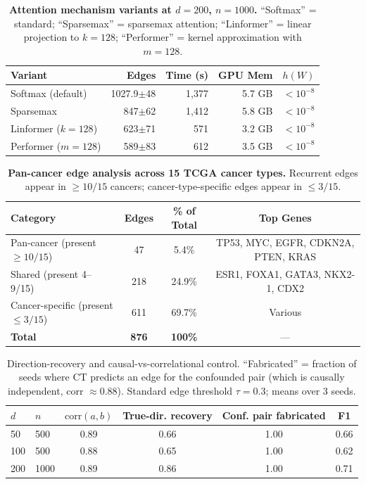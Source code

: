 \documentclass[12pt,a4paper]{article}
\begin{document}
\newpage
\begin{table}[H]
\centering
\caption{\textbf{Attention mechanism variants at $d=200$, $n=1000$.} ``Softmax'' = standard; ``Sparsemax'' = sparsemax attention; ``Linformer'' = linear projection to $k=128$; ``Performer'' = kernel approximation with $m=128$.}
\label{tab:s_ct_attention_variants}
\small
\begin{tabular}{lrrrc}
\toprule
Variant & Edges & Time (s) & GPU Mem & $h(W)$ \\
\midrule
Softmax (default) & 1027.9$\pm$48 & 1,377 & 5.7 GB & $<10^{-8}$ \\
Sparsemax & 847$\pm$62 & 1,412 & 5.8 GB & $<10^{-8}$ \\
Linformer ($k=128$) & 623$\pm$71 & 571 & 3.2 GB & $<10^{-8}$ \\
Performer ($m=128$) & 589$\pm$83 & 612 & 3.5 GB & $<10^{-8}$ \\
\bottomrule
\end{tabular}
\end{table}
\newpage
\begin{table}[H]
\centering
\caption{\textbf{Pan-cancer edge analysis across 15 TCGA cancer types.} Recurrent edges appear in $\ge 10/15$ cancers; cancer-type-specific edges appear in $\le 3/15$.}
\label{tab:s_pancancer}
\small
\begin{tabular}{lccc}
\toprule
Category & Edges & \% of Total & Top Genes \\
\midrule
Pan-cancer (present $\ge 10/15$) & 47 & 5.4\% & TP53, MYC, EGFR, CDKN2A, PTEN, KRAS \\
Shared (present 4--9/15) & 218 & 24.9\% & ESR1, FOXA1, GATA3, NKX2-1, CDX2 \\
Cancer-specific (present $\le 3/15$) & 611 & 69.7\% & Various \\
\midrule
\textbf{Total} & \textbf{876} & \textbf{100\%} & --- \\
\bottomrule
\end{tabular}
\end{table}
\newpage
\begin{table}[H]
\centering
\small
\caption{Direction-recovery and causal-vs-correlational control. ``Fabricated'' = fraction of seeds where CT predicts an edge for the confounded pair (which is causally independent, corr $\approx 0.88$). Standard edge threshold $\tau=0.3$; means over 3 seeds.}
\label{tab:s8_directional}
\begin{tabular}{llcccc}
\toprule
$d$ & $n$ & $\mathrm{corr}(a,b)$ & True-dir. recovery & Conf. pair fabricated & F1 \\
\midrule
50 & 500 & 0.89 & 0.66 & 1.00 & 0.66 \\
100 & 500 & 0.88 & 0.65 & 1.00 & 0.62 \\
200 & 1000 & 0.89 & 0.86 & 1.00 & 0.71 \\
\bottomrule
\end{tabular}
\end{table}
\end{document}
